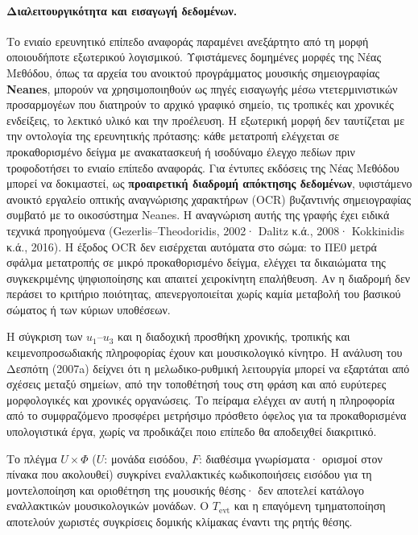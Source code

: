 \documentclass[11pt,a4paper]{article}
\begin{document}
\paragraph{Διαλειτουργικότητα και εισαγωγή δεδομένων.}
Το ενιαίο ερευνητικό επίπεδο αναφοράς παραμένει ανεξάρτητο από τη μορφή οποιουδήποτε εξωτερικού λογισμικού. Υφιστάμενες δομημένες μορφές της Νέας Μεθόδου, όπως τα αρχεία του ανοικτού προγράμματος μουσικής σημειογραφίας \textbf{Neanes}, μπορούν να χρησιμοποιηθούν ως πηγές εισαγωγής μέσω ντετερμινιστικών προσαρμογέων που διατηρούν το αρχικό γραφικό σημείο, τις τροπικές και χρονικές ενδείξεις, το λεκτικό υλικό και την προέλευση. Η εξωτερική μορφή δεν ταυτίζεται με την οντολογία της ερευνητικής πρότασης: κάθε μετατροπή ελέγχεται σε προκαθορισμένο δείγμα με ανακατασκευή ή ισοδύναμο έλεγχο πεδίων πριν τροφοδοτήσει το ενιαίο επίπεδο αναφοράς. Για έντυπες εκδόσεις της Νέας Μεθόδου μπορεί να δοκιμαστεί, ως \textbf{προαιρετική διαδρομή απόκτησης δεδομένων}, υφιστάμενο ανοικτό εργαλείο οπτικής αναγνώρισης χαρακτήρων (OCR) βυζαντινής σημειογραφίας συμβατό με το οικοσύστημα Neanes. Η αναγνώριση αυτής της γραφής έχει ειδικά τεχνικά προηγούμενα (Gezerlis--Theodoridis, 2002· Dalitz κ.ά., 2008· Kokkinidis κ.ά., 2016). Η έξοδος OCR δεν εισέρχεται αυτόματα στο σώμα: το ΠΕ0 μετρά σφάλμα μετατροπής σε μικρό προκαθορισμένο δείγμα, ελέγχει τα δικαιώματα της συγκεκριμένης ψηφιοποίησης και απαιτεί χειροκίνητη επαλήθευση. Αν η διαδρομή δεν περάσει το κριτήριο ποιότητας, απενεργοποιείται χωρίς καμία μεταβολή του βασικού σώματος ή των κύριων υποθέσεων.

Η σύγκριση των $u_1$--$u_3$ και η διαδοχική προσθήκη χρονικής, τροπικής και κειμενοπροσωδιακής πληροφορίας έχουν και μουσικολογικό κίνητρο. Η ανάλυση του Δεσπότη (2007a) δείχνει ότι η μελωδικο-ρυθμική λειτουργία μπορεί να εξαρτάται από σχέσεις μεταξύ σημείων, από την τοποθέτησή τους στη φράση και από ευρύτερες μορφολογικές και χρονικές οργανώσεις. Το πείραμα ελέγχει αν αυτή η πληροφορία από το συμφραζόμενο προσφέρει μετρήσιμο πρόσθετο όφελος για τα προκαθορισμένα υπολογιστικά έργα, χωρίς να προδικάζει ποιο επίπεδο θα αποδειχθεί διακριτικό.

Το πλέγμα $U\times\Phi$ (\(U\): μονάδα εισόδου, \(F\): διαθέσιμα γνωρίσματα· ορισμοί στον πίνακα που ακολουθεί) συγκρίνει εναλλακτικές κωδικοποιήσεις εισόδου για τη μοντελοποίηση και οριοθέτηση της μουσικής θέσης· δεν αποτελεί κατάλογο εναλλακτικών μουσικολογικών μονάδων. Ο $T_{\mathrm{evt}}$ και η επαγόμενη τμηματοποίηση αποτελούν χωριστές συγκρίσεις δομικής κλίμακας έναντι της ρητής θέσης.
\end{document}
